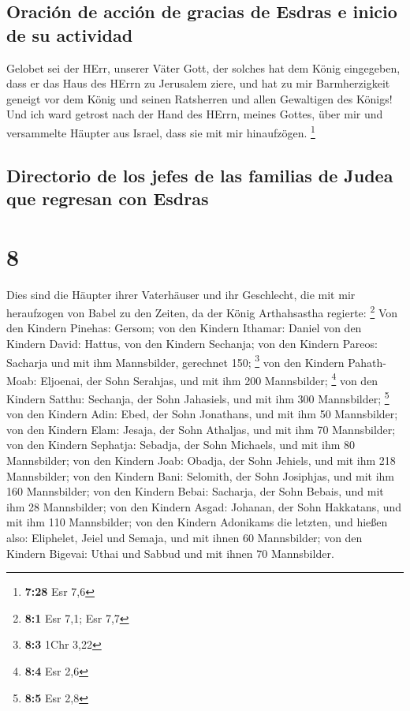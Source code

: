 \hypertarget{oraciuxf3n-de-acciuxf3n-de-gracias-de-esdras-e-inicio-de-su-actividad}{%
\subsection{Oración de acción de gracias de Esdras e inicio de su
actividad}\label{oraciuxf3n-de-acciuxf3n-de-gracias-de-esdras-e-inicio-de-su-actividad}}

 Gelobet sei der HErr, unserer Väter Gott, der solches
hat dem König eingegeben, dass er das Haus des HErrn zu Jerusalem ziere,
 und hat zu mir Barmherzigkeit geneigt vor dem König und
seinen Ratsherren und allen Gewaltigen des Königs! Und ich ward getrost
nach der Hand des HErrn, meines Gottes, über mir und versammelte Häupter
aus Israel, dass sie mit mir hinaufzögen. \footnote{\textbf{7:28} Esr
  7,6}

\hypertarget{directorio-de-los-jefes-de-las-familias-de-judea-que-regresan-con-esdras}{%
\subsection{Directorio de los jefes de las familias de Judea que
regresan con
Esdras}\label{directorio-de-los-jefes-de-las-familias-de-judea-que-regresan-con-esdras}}

\hypertarget{section-7}{%
\section{8}\label{section-7}}

 Dies sind die Häupter ihrer Vaterhäuser und ihr
Geschlecht, die mit mir heraufzogen von Babel zu den Zeiten, da der
König Arthahsastha regierte: \footnote{\textbf{8:1} Esr 7,1; Esr 7,7}
 Von den Kindern Pinehas: Gersom; von den Kindern Ithamar:
Daniel von den Kindern David: Hattus,  von den Kindern
Sechanja; von den Kindern Pareos: Sacharja und mit ihm Mannsbilder,
gerechnet 150; \footnote{\textbf{8:3} 1Chr 3,22}  von den
Kindern Pahath-Moab: Eljoenai, der Sohn Serahjas, und mit ihm 200
Mannsbilder; \footnote{\textbf{8:4} Esr 2,6}  von den
Kindern Satthu: Sechanja, der Sohn Jahasiels, und mit ihm 300
Mannsbilder; \footnote{\textbf{8:5} Esr 2,8}  von den
Kindern Adin: Ebed, der Sohn Jonathans, und mit ihm 50 Mannsbilder;
 von den Kindern Elam: Jesaja, der Sohn Athaljas, und mit
ihm 70 Mannsbilder;  von den Kindern Sephatja: Sebadja,
der Sohn Michaels, und mit ihm 80 Mannsbilder;  von den
Kindern Joab: Obadja, der Sohn Jehiels, und mit ihm 218 Mannsbilder;
 von den Kindern Bani: Selomith, der Sohn Josiphjas, und
mit ihm 160 Mannsbilder;  von den Kindern Bebai:
Sacharja, der Sohn Bebais, und mit ihm 28 Mannsbilder; 
von den Kindern Asgad: Johanan, der Sohn Hakkatans, und mit ihm 110
Mannsbilder;  von den Kindern Adonikams die letzten, und
hießen also: Eliphelet, Jeiel und Semaja, und mit ihnen 60 Mannsbilder;
 von den Kindern Bigevai: Uthai und Sabbud und mit ihnen
70 Mannsbilder.

